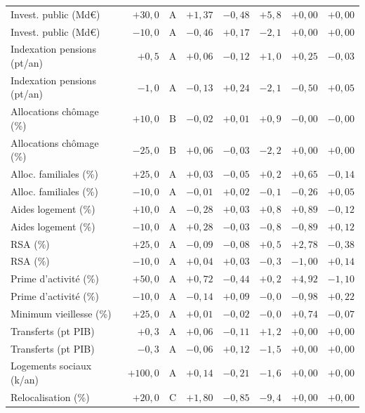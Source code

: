 {\begin{longtable}{p{4.2cm}rcrrrrr}
Invest. public (Md€) & $+30{,}0$ & A & $+1{,}37$ & $-0{,}48$ & $+5{,}8$ & $+0{,}00$ & $+0{,}00$\\
Invest. public (Md€) & $-10{,}0$ & A & $-0{,}46$ & $+0{,}17$ & $-2{,}1$ & $+0{,}00$ & $+0{,}00$\\
Indexation pensions (pt/an) & $+0{,}5$ & A & $+0{,}06$ & $-0{,}12$ & $+1{,}0$ & $+0{,}25$ & $-0{,}03$\\
Indexation pensions (pt/an) & $-1{,}0$ & A & $-0{,}13$ & $+0{,}24$ & $-2{,}1$ & $-0{,}50$ & $+0{,}05$\\
Allocations chômage (\%) & $+10{,}0$ & B & $-0{,}02$ & $+0{,}01$ & $+0{,}9$ & $-0{,}00$ & $-0{,}00$\\
Allocations chômage (\%) & $-25{,}0$ & B & $+0{,}06$ & $-0{,}03$ & $-2{,}2$ & $+0{,}00$ & $+0{,}00$\\
Alloc. familiales (\%) & $+25{,}0$ & A & $+0{,}03$ & $-0{,}05$ & $+0{,}2$ & $+0{,}65$ & $-0{,}14$\\
Alloc. familiales (\%) & $-10{,}0$ & A & $-0{,}01$ & $+0{,}02$ & $-0{,}1$ & $-0{,}26$ & $+0{,}05$\\
Aides logement (\%) & $+10{,}0$ & A & $-0{,}28$ & $+0{,}03$ & $+0{,}8$ & $+0{,}89$ & $-0{,}12$\\
Aides logement (\%) & $-10{,}0$ & A & $+0{,}28$ & $-0{,}03$ & $-0{,}8$ & $-0{,}89$ & $+0{,}12$\\
RSA (\%) & $+25{,}0$ & A & $-0{,}09$ & $-0{,}08$ & $+0{,}5$ & $+2{,}78$ & $-0{,}38$\\
RSA (\%) & $-10{,}0$ & A & $+0{,}04$ & $+0{,}03$ & $-0{,}3$ & $-1{,}00$ & $+0{,}14$\\
Prime d'activité (\%) & $+50{,}0$ & A & $+0{,}72$ & $-0{,}44$ & $+0{,}2$ & $+4{,}92$ & $-1{,}10$\\
Prime d'activité (\%) & $-10{,}0$ & A & $-0{,}14$ & $+0{,}09$ & $-0{,}0$ & $-0{,}98$ & $+0{,}22$\\
Minimum vieillesse (\%) & $+25{,}0$ & A & $+0{,}01$ & $-0{,}02$ & $-0{,}0$ & $+0{,}74$ & $-0{,}07$\\
Transferts (pt PIB) & $+0{,}3$ & A & $+0{,}06$ & $-0{,}11$ & $+1{,}2$ & $+0{,}00$ & $+0{,}00$\\
Transferts (pt PIB) & $-0{,}3$ & A & $-0{,}06$ & $+0{,}12$ & $-1{,}5$ & $+0{,}00$ & $+0{,}00$\\
Logements sociaux (k/an) & $+100{,}0$ & A & $+0{,}14$ & $-0{,}21$ & $-1{,}6$ & $+0{,}00$ & $+0{,}00$\\
Relocalisation (\%) & $+20{,}0$ & C & $+1{,}80$ & $-0{,}85$ & $-9{,}4$ & $+0{,}00$ & $+0{,}00$\\

\end{longtable}}
